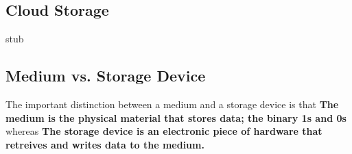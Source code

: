 \documentclass[../main.tex]{subfiles}
\begin{document}
\subsection{Cloud Storage}

stub

\subsection{Medium vs. Storage Device}
\label{3:sec:medium_vs_storage_device}

The important distinction between a medium and a storage device is that \textbf{The medium is the physical material that stores data; the binary 1s and 0s} whereas \textbf{The storage device is an electronic piece of hardware that retreives and writes data to the medium.} 
\end{document}
